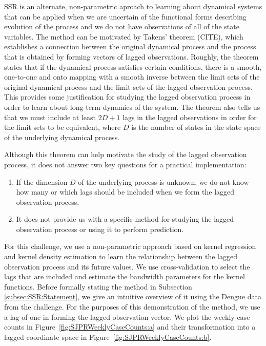 \documentclass[fleqn]{article}\usepackage[]{graphicx}\usepackage[]{color}
\begin{document}
SSR is an alternate, non-parametric aproach to learning about dynamical systems that can be applied when we are uncertain of the functional forms describing evolution of the process and we do not have observations of all of the state variables.  The method can be motivated by Takens' theorem (CITE), which establishes a connection between the original dynamical process and the process that is obtained by forming vectors of lagged observations.  Roughly, the theorem states that if the dynamical process satisfies certain conditions, there is a smooth, one-to-one and onto mapping with a smooth inverse between the limit sets of the original dynamical process and the limit sets of the lagged observation process. This provides some justification for studying the lagged observation process in order to learn about long-term dynamics of the system.  The theorem also tells us that we must include at least $2D + 1$ lags in the lagged observations in order for the limit sets to be equivalent, where $D$ is the number of states in the state space of the underlying dynamical process.

Although this theorem can help motivate the study of the lagged observation process, it does not answer two key questions for a practical implementation:
\begin{enumerate}
  \item If the dimension $D$ of the underlying process is unknown, we do not know how many or which lags should be included when we form the lagged observation process.
  \item It does not provide us with a specific method for studying the lagged observation process or using it to perform prediction.
\end{enumerate}

For this challenge, we use a non-parametric approach based on kernel regression and kernel density estimation to learn the relationship between the lagged observation process and its future values.  We use cross-validation to select the lags that are included and estimate the bandwidth parameters for the kernel functions.  Before formally stating the method in Subsection \ref{subsec:SSR:Statement}, we give an intuitive overview of it using the Dengue data from the challenge.  For the purposes of this demonstration of the method, we use a lag of one in forming the lagged observation vector.  We plot the weekly case counts in Figure~\ref{fig:SJPRWeeklyCaseCounts:a} and their transformation into a lagged coordinate space in Figure~\ref{fig:SJPRWeeklyCaseCounts:b}.
\end{document}
